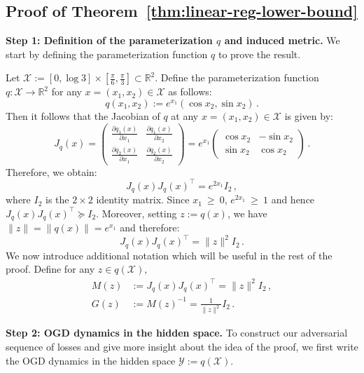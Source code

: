 \documentclass[a4paper,11pt,fullpage]{article}
\def\Y{{\mathcal Y}}
\theoremstyle{plain}
\theoremstyle{definition}
\theoremstyle{plain}
\renewcommand{\geq}{~\ge~}
\begin{document}
\subsection{Proof of Theorem~\ref{thm:linear-reg-lower-bound}}
\label{appx:complete-proof-thm:linear-reg-lower-bound}

\textbf{Step 1: Definition of the parameterization $q$ and induced metric.} We start by defining the parameterization function $q$ to prove the result. 

Let $\mathcal{X} := [0,\log 3] \times [\frac \pi 6, \frac \pi 3] \subset \mathbb{R}^2.$ Define the parameterization function $q: \mathcal{X} \to \mathbb{R}^2$ for any $x = (x_1, x_2) \in \mathcal{X}$ as follows: 
\begin{equation*}
q(x_1,x_2) := e^{x_1} (\cos x_2, \sin x_2)\,.
\end{equation*}
Then it follows that the Jacobian of $q$ at any $x = (x_1, x_2) \in \mathcal{X} $ is given by: 
\begin{equation*}
J_q(x) = 
\begin{pmatrix}
\frac{\partial q_1(x)}{\partial x_1} & \frac{\partial q_1(x)}{\partial x_2} \\
\frac{\partial q_2(x)}{\partial x_1} & \frac{\partial q_2(x)}{\partial x_2}
\end{pmatrix} 
= e^{x_1} 
\begin{pmatrix} 
 \cos x_2 &  -  \sin x_2\\ 
 \sin x_2 &  \cos x_2
\end{pmatrix}
\,.
\end{equation*}
Therefore, we obtain: 
\begin{equation*}
J_q(x) J_q(x)^{\top} = e^{2x_1} I_2\,, 
\end{equation*}
where $I_2$ is the $2\times 2$ identity matrix. Since $x_1 \geq 0$, $e^{2x_1} \geq 1$ and hence $J_q(x) J_q(x)^{\top} \succeq I_2$. 
Moreover, setting $z := q(x)$, we have $\|z\| = \|q(x)\| = e^{x_1}$ and therefore: 
\begin{equation*}
J_q(x) J_q(x)^{\top} = \|z\|^2 I_2\,.
\end{equation*}
We now introduce additional notation which will be useful in the rest of the proof. Define for any $z \in q(\mathcal{X})$,  
\begin{align*}
M(z) &:= J_q(x) J_q(x)^{\top} = \|z\|^2 I_2\,,\\ 
G(z) &:= M(z)^{-1} = \frac{1}{\|z\|^2} I_2\,.
\end{align*}

\noindent\textbf{Step 2: OGD dynamics in the hidden space.} To construct our adversarial sequence of losses and give more insight about the idea of the proof, we first write the OGD dynamics in the hidden space $\Y := q(\mathcal{X}).$ 
\end{document}
